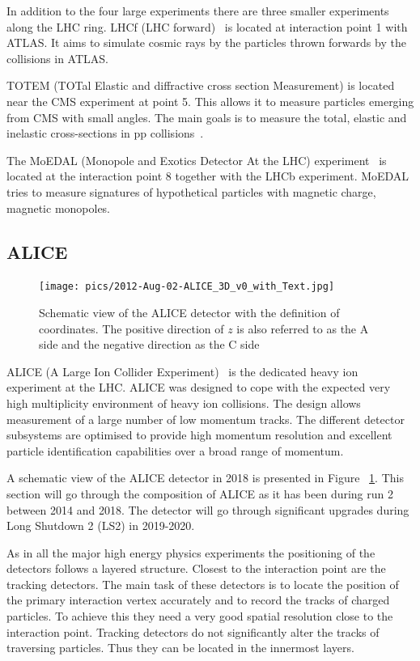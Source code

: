 In addition to the four large experiments there are three smaller experiments along the LHC ring. LHCf (LHC forward)~\cite{Adriani:2008zz} is located at interaction point 1 with ATLAS. It aims to simulate cosmic rays by the particles thrown forwards by the collisions in ATLAS.

TOTEM (TOTal Elastic and diffractive cross section Measurement) is located near the CMS experiment at point 5. This allows it to measure particles emerging from CMS with small angles. The main goals is to measure the total, elastic and inelastic cross-sections in pp collisions~\cite{Anelli:2008zza}.

The MoEDAL (Monopole and Exotics Detector At the LHC) experiment~\cite{MoEDAL:2016jlb} is located at the interaction point 8 together with the LHCb experiment. MoEDAL tries to measure signatures of hypothetical particles with magnetic charge, magnetic monopoles.




\subsection{ALICE}
\label{sec:alice}
\begin{figure}[htb]

\centering
\texttt{[image: pics/2012-Aug-02-ALICE\_3D\_v0\_with\_Text.jpg]}
\caption[ALICE]{Schematic view of the ALICE detector with the definition of coordinates. The positive direction of $z$ is also referred to as the A side and the negative direction as the C side}
\label{fig:alice}
\end{figure}

ALICE (A Large Ion Collider Experiment)~\cite{ALICE} is the dedicated heavy ion experiment at the LHC. ALICE was designed to cope with the expected very high multiplicity environment of heavy ion collisions. The design allows measurement of a large number of low momentum tracks. The different detector subsystems are optimised to provide high momentum resolution and excellent particle identification capabilities over a broad range of momentum.

A schematic view of the ALICE detector in 2018 is presented in Figure ~\ref{fig:alice}. This section will go through the composition of ALICE as it has been during run 2 between 2014 and 2018. The detector will go through significant upgrades during Long Shutdown 2 (LS2) in 2019-2020. 

As in all the major high energy physics experiments the positioning of the detectors follows a layered structure. Closest to the interaction point are the tracking detectors. The main task of these detectors is to locate the position of the primary interaction vertex accurately and to record the tracks of charged particles. To achieve this they need a very good spatial resolution close to the interaction point. Tracking detectors do not significantly alter the tracks of traversing particles. Thus they can be located in the innermost layers.

